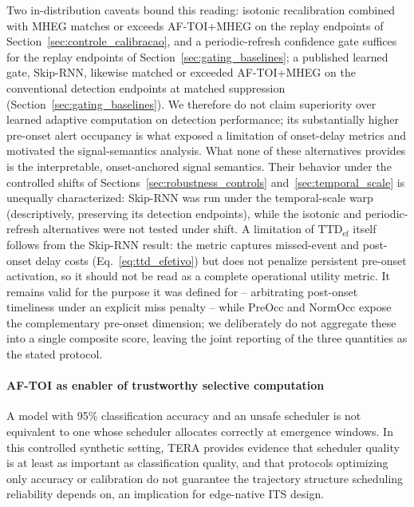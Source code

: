 \documentclass[a4paper,fleqn]{cas-dc}
\newcommand{\MHEG}{\mbox{MHEG}\xspace}
\begin{document}
{\color{\revcolor}Two in-distribution caveats bound this reading: isotonic
recalibration combined with \MHEG matches or exceeds \mbox{AF-TOI}+MHEG on
the replay endpoints of Section~\ref{sec:controle_calibracao}, and a
periodic-refresh confidence gate suffices for the replay endpoints of
Section~\ref{sec:gating_baselines}; a published learned gate, Skip-RNN,
likewise matched or exceeded \mbox{AF-TOI}+MHEG on the conventional
detection endpoints at matched suppression
(Section~\ref{sec:gating_baselines}). We therefore do not claim superiority
over learned adaptive computation on detection performance; its
substantially higher pre-onset alert occupancy is what exposed a limitation
of onset-delay metrics and motivated the signal-semantics analysis. What
none of these alternatives provides is the interpretable, onset-anchored
signal semantics. Their behavior under the controlled shifts of
Sections~\ref{sec:robustness_controls} and~\ref{sec:temporal_scale} is
unequally characterized: Skip-RNN was run under the temporal-scale warp
(descriptively, preserving its detection endpoints), while the isotonic and
periodic-refresh alternatives were not tested under shift. A
limitation of $\mathrm{TTD}_{\mathrm{ef}}$ itself follows from the Skip-RNN
result: the metric captures missed-event and post-onset delay costs
(Eq.~\ref{eq:ttd_efetivo}) but does not penalize persistent pre-onset
activation, so it should not be read as a complete operational utility
metric. It remains valid for the purpose it was defined for -- arbitrating
post-onset timeliness under an explicit miss penalty -- while PreOcc and
NormOcc expose the complementary pre-onset dimension; we deliberately do not
aggregate these into a single composite score, leaving the joint reporting of the three quantities as the stated protocol.}
\paragraph{AF-TOI as enabler of trustworthy selective computation}
A model with 95\% classification accuracy and an unsafe scheduler is not
equivalent to one whose scheduler allocates correctly at emergence windows. In
this controlled synthetic setting, TERA provides evidence that scheduler
quality is at least as important as classification quality, and that protocols
optimizing only accuracy or calibration do not guarantee the trajectory
structure scheduling reliability depends on, an implication for edge-native
ITS design.
\end{document}
